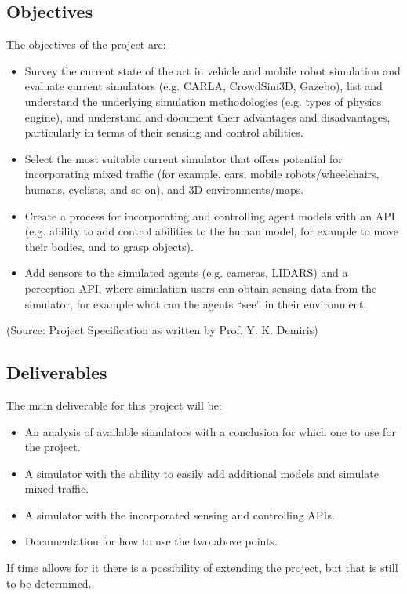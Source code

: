 \subsection{Objectives}
The objectives of the project are: 
\begin{itemize}
    \item Survey the current state of the art in vehicle and mobile robot simulation and evaluate current simulators (e.g. CARLA, CrowdSim3D, Gazebo), list and understand the underlying simulation methodologies (e.g. types of physics engine), and understand and document their advantages and disadvantages, particularly in terms of their sensing and control abilities.
    \item Select the most suitable current simulator that offers potential for incorporating mixed traffic (for example, cars, mobile robots/wheelchairs, humans, cyclists, and so on), and 3D environments/maps.
    \item Create a process for incorporating and controlling agent models with an API (e.g. ability to add control abilities to the human model, for example to move their bodies, and to grasp objects).
    \item Add sensors to the simulated agents (e.g. cameras, LIDARS) and a perception API, where simulation users can obtain sensing data from the simulator, for example what can the agents “see” in their environment.
\end{itemize}
(Source: Project Specification as written by Prof. Y. K. Demiris)
\subsection{Deliverables}
The main deliverable for this project will be:
\begin{itemize}
    \item An analysis of available simulators with a conclusion for which one to use for the project.
    \item A simulator with the ability to easily add additional models and simulate mixed traffic.
    \item A simulator with the incorporated sensing and controlling APIs.
    \item Documentation for how to use the two above points.
\end{itemize}
If time allows for it there is a possibility of extending the project, but that is still to be determined. 

